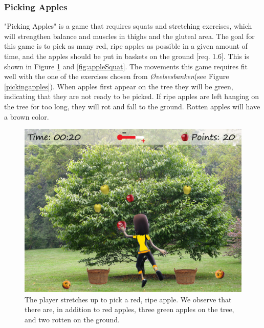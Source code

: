 \subsubsection{Picking Apples}
"Picking Apples" is a game that requires squats and stretching exercises, which will strengthen balance and muscles in thighs and the gluteal area. The goal for this game is to pick as many red, ripe apples as possible in a given amount of time, and the apples should be put in baskets on the ground [req. 1.6]. This is shown in Figure \ref{fig:appleStretch} and \ref{fig:appleSquat}. The movements this game requires fit well with the one of the exercises chosen from \emph{Øvelsesbanken}(see Figure \ref{pickingapples}). When apples first appear on the tree they will be green, indicating that they are not ready to be picked. If ripe apples are left hanging on the tree for too long, they will rot and fall to the ground. Rotten apples will have a brown color. 

\begin{figure} [H]
\centering
\includegraphics[scale=0.07]{gameappletreeEng.jpg}
\caption[Picking apples - stretching]{The player stretches up to pick a red, ripe apple. We observe that there are, in addition to red apples, three green apples on the tree, and two rotten on the ground.}
\label{fig:appleStretch}
\end{figure}

